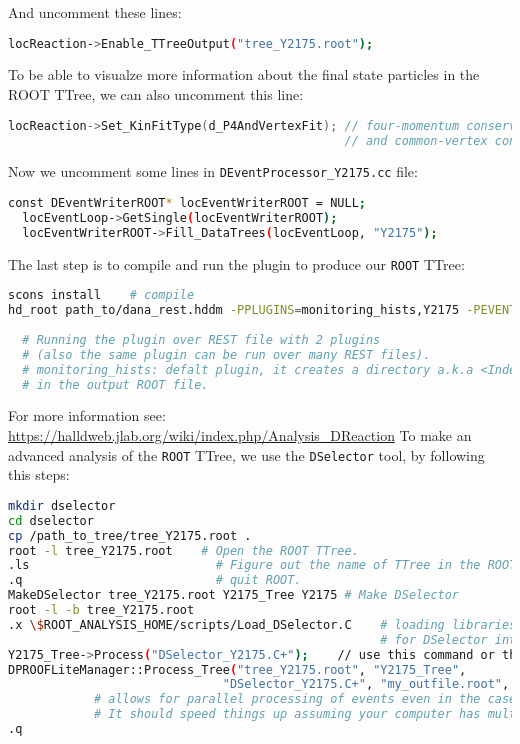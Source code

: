 \documentclass{article}
\begin{document}
And uncomment these lines:

\begin{lstlisting}[language=bash]
locReaction->Enable_TTreeOutput("tree_Y2175.root");
\end{lstlisting}
 
To be able to visualze more information about the final state particles in the ROOT TTree, we can also uncomment this line:

\begin{lstlisting}[language=c++]
locReaction->Set_KinFitType(d_P4AndVertexFit); // four-momentum conservation 
                                               // and common-vertex constraints
\end{lstlisting}

Now we uncomment some lines in \texttt{DEventProcessor\_Y2175.cc} file:

\begin{lstlisting}[language=bash]
  const DEventWriterROOT* locEventWriterROOT = NULL;             
  locEventLoop->GetSingle(locEventWriterROOT);
  locEventWriterROOT->Fill_DataTrees(locEventLoop, "Y2175");
\end{lstlisting}

The last step is to compile and run the plugin to produce our \texttt{ROOT} TTree:

\begin{lstlisting}[language=bash]
scons install    # compile
hd_root path_to/dana_rest.hddm -PPLUGINS=monitoring_hists,Y2175 -PEVENTS_TO_KEEP=10000
  
  # Running the plugin over REST file with 2 plugins 
  # (also the same plugin can be run over many REST files).
  # monitoring_hists: defalt plugin, it creates a directory a.k.a <Independant> 
  # in the output ROOT file.
\end{lstlisting}

For more information see: \url{https://halldweb.jlab.org/wiki/index.php/Analysis_DReaction}
\newline To make an advanced analysis of the \texttt{ROOT} TTree, we use the \texttt{DSelector} tool, by following this steps:

\begin{lstlisting}[language=bash]
mkdir dselector
cd dselector
cp /path_to_tree/tree_Y2175.root .
root -l tree_Y2175.root    # Open the ROOT TTree.
.ls                          # Figure out the name of TTree in the ROOT file.
.q                           # quit ROOT.
MakeDSelector tree_Y2175.root Y2175_Tree Y2175 # Make DSelector
root -l -b tree_Y2175.root             
.x \$ROOT_ANALYSIS_HOME/scripts/Load_DSelector.C    # loading libraries and environment
                                                    # for DSelector into ROOT
Y2175_Tree->Process("DSelector_Y2175.C+");    // use this command or the one below.
DPROOFLiteManager::Process_Tree("tree_Y2175.root", "Y2175_Tree",
                              "DSelector_Y2175.C+", "my_outfile.root", 2); //2 threads
            # allows for parallel processing of events even in the case of one TTree.
            # It should speed things up assuming your computer has multiple cores.
.q
\end{lstlisting}
\end{document}
